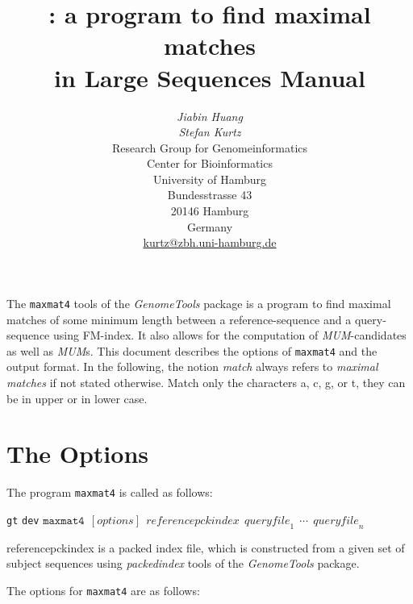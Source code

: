 \documentclass[12pt]{article}
\title{\MMFour: a program to find maximal matches\\
       in Large Sequences Manual}
\author{\begin{tabular}{c}
         \textit{Jiabin Huang}\\
         \textit{Stefan Kurtz}\\[1cm]
         Research Group for Genomeinformatics\\
         Center for Bioinformatics\\
         University of Hamburg\\
         Bundesstrasse 43\\
         20146 Hamburg\\
         Germany\\[1cm]
         \url{kurtz@zbh.uni-hamburg.de}\\[1cm]
        \end{tabular}}
\newcommand{\MMFour}{\texttt{maxmat4}\xspace}
\newcommand{\GenomeTools}{\textit{GenomeTools}\xspace}
\newcommand{\MUM}[0]{\textit{MUM}\xspace}
\newcommand{\packedindex}{\textit{packedindex}\xspace}
\newcommand{\Repfind}[0]{\texttt{\small repfind}\xspace}
\begin{document}
\maketitle

The \MMFour tools of the \GenomeTools package is a program to
find maximal matches of some minimum length between a reference-sequence 
and a query-sequence using FM-index\cite{Ferragina00opportunisticdata}. It also allows for 
the computation of \MUM-candidates as well as \MUM{s}. This document describes
the options of \MMFour and the output format. 
In the following, the notion
\emph{match}  always refers to \emph{maximal matches} if not stated
otherwise. Match only the characters a, c, g, or t, they can be in upper or in lower case.

\section{The Options}

The program \MMFour is called as follows:

\noindent\texttt{gt}  \noindent\texttt{dev}  
$\MMFour~~[\mathit{options}]~~\mathit{referencepckindex}~~
           \mathit{queryfile}_{1}~~\cdots~~\mathit{queryfile}_{n}$
           
referencepckindex is a packed index file, which is constructed from a given set of subject sequences 
using \packedindex tools of the \GenomeTools package.

The options for \MMFour are as follows:
\end{document}
